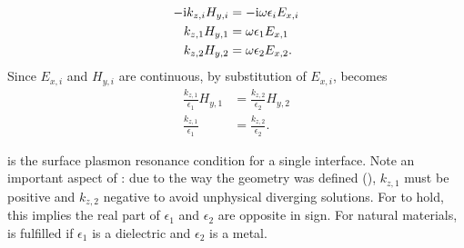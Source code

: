 \begin{align}
-{\mathrm{i}} k_{z,i} H_{y,i} &= -{\mathrm{i}} \omega \epsilon_i E_{x,i}\\
k_{z,1} H_{y,1} &= \omega \epsilon_1 E_{x,1}\\
k_{z,2} H_{y,2} &= \omega \epsilon_2 E_{x,2}.
\label{eqn:spderivsteptwo}
\end{align}
Since $E_{x,i}$ and $H_{y,i}$ are continuous,
by substitution of $E_{x,i}$,  becomes
\begin{align}
\frac{k_{z,1}}{\epsilon_1}H_{y,1}&=\frac{k_{z,2}}{\epsilon_2}H_{y,2}\\
\frac{k_{z,1}}{\epsilon_1}&=\frac{k_{z,2}}{\epsilon_2}.
\label{eqn:sprcondition}
\end{align}

 is the surface plasmon resonance condition for
a single interface.  Note an important aspect of
:  due to the way the geometry was defined
(), $k_{z,1}$ must be positive and $k_{z,2}$
negative to avoid unphysical diverging solutions.  For
 to hold, this implies the real part of
$\epsilon_1$ and $\epsilon_2$ are opposite in sign.  For natural materials,
 is fulfilled if $\epsilon_1$ is a dielectric
and $\epsilon_2$ is a metal.

